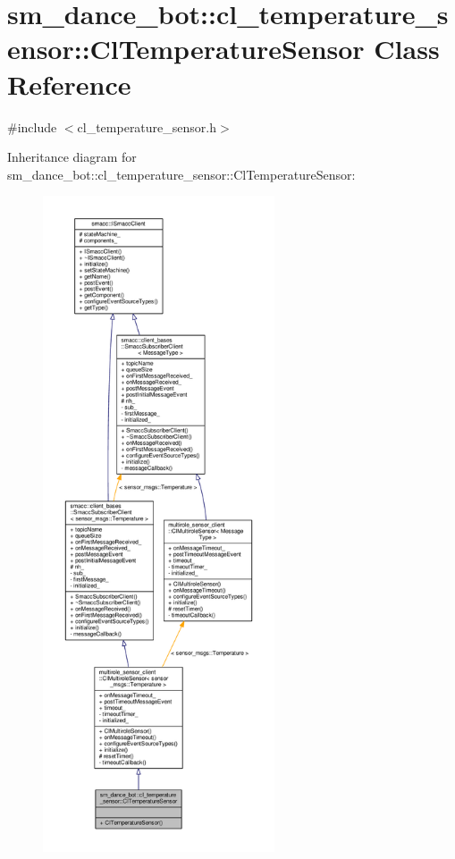 \hypertarget{classsm__dance__bot_1_1cl__temperature__sensor_1_1ClTemperatureSensor}{}\section{sm\+\_\+dance\+\_\+bot\+:\+:cl\+\_\+temperature\+\_\+sensor\+:\+:Cl\+Temperature\+Sensor Class Reference}
\label{classsm__dance__bot_1_1cl__temperature__sensor_1_1ClTemperatureSensor}


{\ttfamily \#include $<$cl\+\_\+temperature\+\_\+sensor.\+h$>$}



Inheritance diagram for sm\+\_\+dance\+\_\+bot\+:\+:cl\+\_\+temperature\+\_\+sensor\+:\+:Cl\+Temperature\+Sensor\+:\nopagebreak
\begin{figure}[H]
\begin{center}
\leavevmode
\includegraphics[height=550pt]{classsm__dance__bot_1_1cl__temperature__sensor_1_1ClTemperatureSensor__inherit__graph}
\end{center}
\end{figure}


